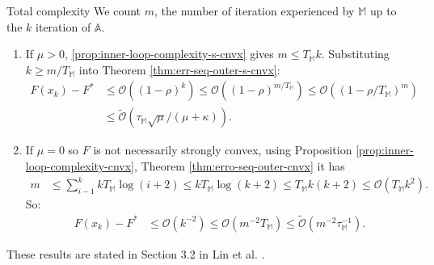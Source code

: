 \documentclass[11pt]{beamer}
\theoremstyle{definition}
\begin{document}
        \begin{frame}{Total complexity}
            We count $m$, the number of iteration experienced by $\mathbb M$ up to the $k$ iteration of $\mathbb A$. 
            \begin{enumerate}
                \item If $\mu > 0$, \ref{prop:inner-loop-complexity-s-cnvx} gives $m \le T_{\mathbb M}k$. 
                Substituting $k \ge m/T_{\mathbb M}$ into Theorem \ref{thm:err-seq-outer-s-cnvx}: 
                {\footnotesize
                \begin{align*}
                    F(x_k) - F^* &\le \mathcal O \left(
                        (1 - \rho)^k 
                    \right) \le 
                    \mathcal O \left(
                        (1 - \rho)^{m/ T_{\mathbb M}}
                    \right) \le 
                    \mathcal O\left(
                        \left(1 - \rho/T_{\mathbb M}\right)^{m}
                    \right)
                    \\
                    &\le \widetilde{\mathcal O}\left(
                        \tau_{\mathbb M}\sqrt{\mu}/(\mu + \kappa)
                    \right). 
                \end{align*}
                }
                \item If $\mu = 0$ so $F$ is not necessarily strongly convex, using Proposition \ref{prop:inner-loop-complexity-cnvx}, Theorem \ref{thm:erro-seq-outer-cnvx} it has 
                {\footnotesize
                \begin{align*}
                    m &\le \sum_{i - 1}^{k} k T_{\mathbb M} \log(i + 2) \le k T_{\mathbb M} \log(k + 2) 
                    \le T_{\mathbb M}k(k + 2) 
                    \le 
                    \mathcal O(T_{\mathbb M} k^2). 
                \end{align*}
                So: 
                \begin{align*}
                    F(x_k)- F^* &\le 
                    \mathcal O(k^{-2})\le 
                    \mathcal O
                        \left(
                            m^{-2}T_{\mathbb M}
                        \right) 
                        \le \widetilde{\mathcal O}
                            \left(m^{-2}\tau_{\mathbb M}^{-1}\right). 
                \end{align*}
                }
            \end{enumerate}
            These results are stated in Section 3.2 in Lin et al. \cite{lin_universal_2015}. 
        \end{frame}
\end{document}
